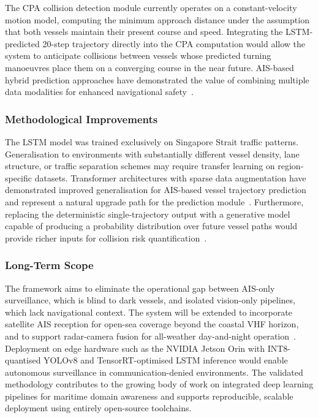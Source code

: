 \documentclass{ieeeaccess}
\begin{document}
The CPA collision detection module currently operates on a 
constant-velocity motion model, computing the minimum approach 
distance under the assumption that both vessels maintain their 
present course and speed. Integrating the LSTM-predicted 20-step 
trajectory directly into the CPA computation would allow the system 
to anticipate collisions between vessels whose predicted turning 
manoeuvres place them on a converging course in the near future. 
AIS-based hybrid prediction approaches have demonstrated the value 
of combining multiple data modalities for enhanced navigational 
safety~\cite{b29}.

\subsubsection*{Methodological Improvements}

The LSTM model was trained exclusively on Singapore Strait traffic 
patterns. Generalisation to environments with substantially different 
vessel density, lane structure, or traffic separation schemes may 
require transfer learning on region-specific datasets. Transformer 
architectures with sparse data augmentation have demonstrated 
improved generalisation for AIS-based vessel trajectory prediction 
and represent a natural upgrade path for the prediction 
module~\cite{b30}. Furthermore, replacing the deterministic 
single-trajectory output with a generative model capable of 
producing a probability distribution over future vessel paths would 
provide richer inputs for collision risk 
quantification~\cite{b31}.

\subsubsection*{Long-Term Scope}

The framework aims to eliminate the operational gap between AIS-only 
surveillance, which is blind to dark vessels, and isolated 
vision-only pipelines, which lack navigational context. The system 
will be extended to incorporate satellite AIS reception for 
open-sea coverage beyond the coastal VHF horizon, and to support 
radar-camera fusion for all-weather day-and-night 
operation~\cite{b14}. Deployment on edge hardware such as the 
NVIDIA Jetson Orin with INT8-quantised YOLOv8 and TensorRT-optimised 
LSTM inference would enable autonomous surveillance in 
communication-denied environments. The validated methodology 
contributes to the growing body of work on integrated deep learning 
pipelines for maritime domain awareness and supports reproducible, 
scalable deployment using entirely open-source toolchains.
\end{document}
